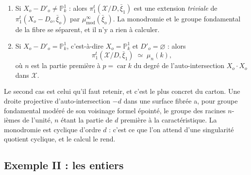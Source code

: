 \documentclass[11pt,a4paper]{article}
\begin{document}
\begin{enumerate}
  \item[1)] Si $X_{o} - D'_{o} \neq \mathbb{P}^{1}_{k}$ : alors
    $\pi_{1}^{t}(\mathcal{X}/D, \bar{\xi}_{1})$ est une extension
    \emph{triviale} de $\pi_{1}^{t}(X_{o} - D_{o}, \bar{\xi}_{o})$ par
    $\mu^{\infty}_{\mathrm{mod}}(\bar{\xi}_{o})$. La monodromie et le groupe
    fondamental de la fibre se séparent, et il n'y a rien à calculer.
  \item[2)] Si $X_{o} - D'_{o} = \mathbb{P}^{1}_{k}$, c'est-à-dire
    $X_{o} = \mathbb{P}^{1}_{k}$ et $D'_{o} = \varnothing$ : alors
    \[
      \pi_{1}^{t}(\mathcal{X}/D, \bar{\xi}_{1}) \;\simeq\; \mu_{n}(k) ,
    \]
    où $n$ est la partie première à $p = \operatorname{car} k$ du degré de
    l'auto-intersection $X_{o} \cdot X_{o}$ dans $\mathcal{X}$.
\end{enumerate}

Le second cas est celui qu'il faut retenir, et c'est le plus concret du carton.
Une droite projective d'auto-intersection $-d$ dans une surface fibrée a, pour
groupe fondamental modéré de son voisinage formel épointé, le groupe des
racines $n$-ièmes de l'unité, $n$ étant la partie de $d$ première à la
caractéristique. La monodromie est cyclique d'ordre $d$ : c'est ce que l'on
attend d'une singularité quotient cyclique, et le calcul le rend.

\subsection*{Exemple II : les entiers}
\end{document}
